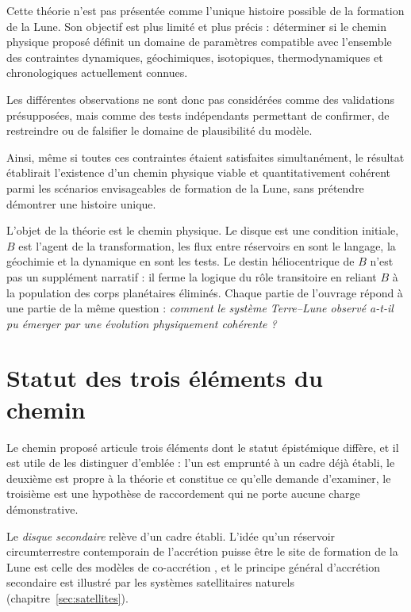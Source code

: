 \documentclass[11pt,a4paper,openany]{report}
\begin{document}
Cette théorie n'est pas présentée comme l'unique histoire possible de la formation de la Lune.
Son objectif est plus limité et plus précis : déterminer si le chemin physique proposé définit un
domaine de paramètres compatible avec l'ensemble des contraintes dynamiques, géochimiques,
isotopiques, thermodynamiques et chronologiques actuellement connues.

Les différentes observations ne sont donc pas considérées comme des validations présupposées,
mais comme des tests indépendants permettant de confirmer, de restreindre ou de falsifier le
domaine de plausibilité du modèle.

Ainsi, même si toutes ces contraintes étaient satisfaites simultanément, le résultat établirait
l'existence d'un chemin physique viable et quantitativement cohérent parmi les scénarios
envisageables de formation de la Lune, sans prétendre démontrer une histoire unique.

\begin{ideephys}
L'objet de la théorie est le chemin physique. Le disque est une condition initiale, $B$ est l'agent
de la transformation, les flux entre réservoirs en sont le langage, la géochimie et la dynamique en
sont les tests. Le destin héliocentrique de $B$ n'est pas un supplément narratif : il ferme la logique
du rôle transitoire en reliant $B$ à la population des corps planétaires éliminés. Chaque partie de
l'ouvrage répond à une partie de la même question :
\emph{comment le système Terre--Lune observé a-t-il pu émerger par une évolution
physiquement cohérente ?}
\end{ideephys}

\section{Statut des trois éléments du chemin}

Le chemin proposé articule trois éléments dont le statut épistémique diffère, et il est utile de
les distinguer d'emblée : l'un est emprunté à un cadre déjà établi, le deuxième est propre à la
théorie et constitue ce qu'elle demande d'examiner, le troisième est une hypothèse de raccordement
qui ne porte aucune charge démonstrative.

Le \emph{disque secondaire} relève d'un cadre établi. L'idée qu'un réservoir circumterrestre
contemporain de l'accrétion puisse être le site de formation de la Lune est celle des modèles de
co-accrétion \cite{Ruskol1960,Weidenschilling1986}, et le principe général d'accrétion secondaire
est illustré par les systèmes satellitaires naturels (chapitre~\ref{sec:satellites}).
\end{document}
